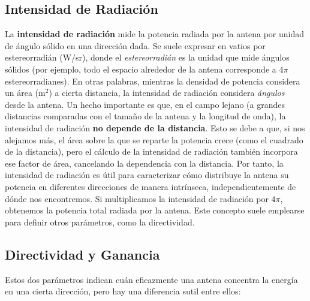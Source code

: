 \subsection{Intensidad de Radiación}

La \textbf{intensidad de radiación} mide la potencia radiada por la antena por unidad de ángulo sólido en una dirección dada. Se suele expresar en vatios por estereorradián (W/sr), donde el \textit{estereorradián} es la unidad que mide ángulos sólidos (por ejemplo, todo el espacio alrededor de la antena corresponde a $4\pi$ estereorradianes). En otras palabras, mientras la densidad de potencia considera un área (m\(^2\)) a cierta distancia, la intensidad de radiación considera \textit{ángulos} desde la antena. Un hecho importante es que, en el campo lejano (a grandes distancias comparadas con el tamaño de la antena y la longitud de onda), la intensidad de radiación \textbf{no depende de la distancia}. Esto se debe a que, si nos alejamos más, el área sobre la que se reparte la potencia crece (como el cuadrado de la distancia), pero el cálculo de la intensidad de radiación también incorpora ese factor de área, cancelando la dependencia con la distancia. Por tanto, la intensidad de radiación es útil para caracterizar cómo distribuye la antena su potencia en diferentes direcciones de manera intrínseca, independientemente de dónde nos encontremos. Si multiplicamos la intensidad de radiación por $4\pi$, obtenemos la potencia total radiada por la antena. Este concepto suele emplearse para definir otros parámetros, como la directividad.

\subsection{Directividad y Ganancia}

Estos dos parámetros indican cuán eficazmente una antena concentra la energía en una cierta dirección, pero hay una diferencia sutil entre ellos:\\

